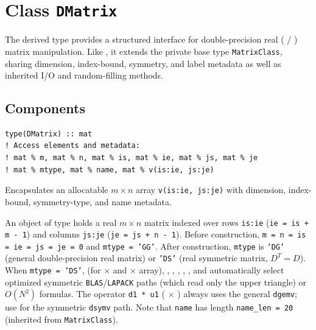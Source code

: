 \section{Class \texttt{DMatrix}}
\label{sec:class_dmatrix}

The  derived type provides a structured interface for double-precision real ( / ) matrix manipulation. Like , it extends the private base type \texttt{MatrixClass}, sharing dimension, index-bound, symmetry, and label metadata as well as inherited I/O and random-filling methods.

\subsection{Components}
\label{subsec:dmat_components}


\lstset{language=[95]Fortran}
\begin{lstlisting}
type(DMatrix) :: mat
! Access elements and metadata:
! mat % m, mat % n, mat % is, mat % ie, mat % js, mat % je
! mat % mtype, mat % name, mat % v(is:ie, js:je)
\end{lstlisting}

Encapsulates an allocatable $m \times n$  array \texttt{v(is:ie, js:je)} with dimension, index-bound, symmetry-type, and name metadata.

An object of type  holds a real $m \times n$ matrix indexed over rows \texttt{is:ie} (\texttt{ie = is + m - 1}) and columns \texttt{js:je} (\texttt{je = js + n - 1}). Before construction, \texttt{m = n = is = ie = js = je = 0} and \texttt{mtype = 'GG'}. After construction, \texttt{mtype} is \texttt{'DG'} (general double-precision real matrix) or \texttt{'DS'} (real symmetric matrix, $D^T = D$). When \texttt{mtype = 'DS'}, \procname{*} (for  $\times$  and  $\times$ array), , , , , , and  automatically select optimized symmetric \texttt{BLAS}/\texttt{LAPACK} paths (which read only the upper triangle) or $O(N^2)$ formulas. The operator \texttt{d1 * u1} ( $\times$ ) always uses the general \texttt{dgemv}; use  for the symmetric \texttt{dsymv} path. Note that \texttt{name} has length \texttt{name\_len = 20} (inherited from \texttt{MatrixClass}).

